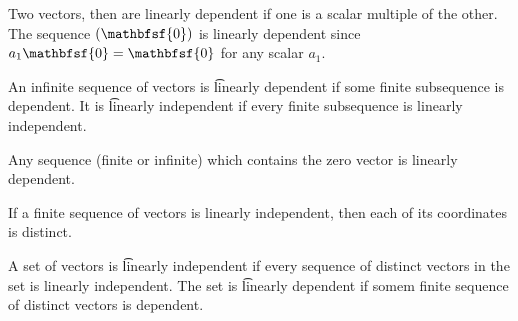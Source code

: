 Two vectors, then are linearly dependent if one is a scalar multiple of the other.
The sequence $(\mathbfsf{0})$ is linearly dependent since $a_1 \mathbfsf{0} = \mathbfsf{0}$ for any scalar $a_1$.

An infinite sequence of vectors is \t{linearly dependent} if some finite subsequence is dependent.
It is \t{linearly independent} if every finite subsequence is linearly independent.

Any sequence (finite or infinite) which contains the zero vector is linearly dependent.

If a finite sequence of vectors is linearly independent, then each of its coordinates is distinct.

A set of vectors is \t{linearly independent} if every sequence of distinct vectors in the set is linearly independent.
The set is \t{linearly dependent} if somem finite sequence of distinct vectors is dependent.
\strats
